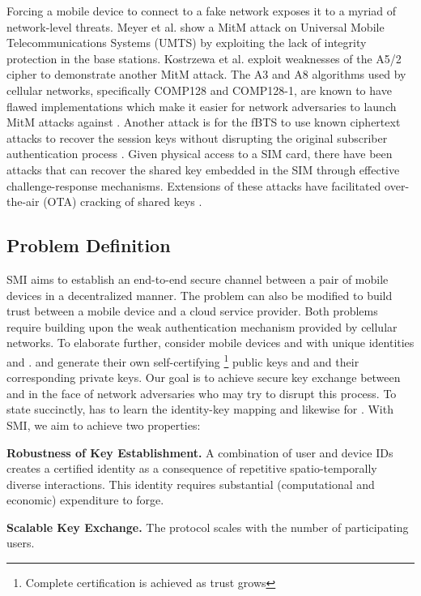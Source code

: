 \documentclass[letterpaper,twocolumn]{sig-alternate}
\begin{document}
Forcing a mobile device to connect to a fake network exposes it to a myriad of network-level threats. Meyer et al. \cite{germany} show a MitM attack on Universal Mobile Telecommunications Systems (UMTS) by exploiting the lack of integrity protection in the base stations. Kostrzewa et al. \cite{thesis} exploit weaknesses of the A5/2 \cite{comp128} cipher to demonstrate another MitM attack. The A3 and A8 algorithms used by cellular networks, specifically COMP128 and COMP128-1, are known to have flawed implementations which make it easier for network adversaries to launch MitM attacks against \cite{toorani2008solutions}. Another attack is for the fBTS to use known ciphertext attacks \cite{kca} to recover the session keys without disrupting the original subscriber authentication process \cite{barkan2003instant}. Given physical access to a SIM card, there have been attacks that can recover the shared key embedded in the SIM through effective challenge-response mechanisms. Extensions of these attacks have facilitated over-the-air (OTA) cracking of shared keys \cite{nohl,mathur2008radio}. 


\subsection{Problem Definition}
\label{definition}

SMI aims to establish an end-to-end secure channel between a pair of mobile devices in a decentralized manner. The problem can also be modified to build trust between a mobile device and a cloud service provider. Both problems require building upon the weak authentication mechanism provided by cellular networks. To elaborate further, consider mobile devices  and  with unique identities  and .  and  generate their own self-certifying \footnote{Complete certification is achieved as trust grows} public keys  and  and their corresponding private keys. Our goal is to achieve secure key exchange between  and  in the face of network adversaries who may try to disrupt this process. To state succinctly,  has to learn the identity-key mapping  and likewise for . With SMI, we aim to achieve two properties:

\textbf{Robustness of Key Establishment.} A combination of user and device IDs creates a certified identity as a consequence of repetitive spatio-temporally diverse interactions. This identity requires substantial (computational and economic) expenditure to forge.

\textbf{Scalable Key Exchange.} The protocol scales with the number of participating users. 
\end{document}
